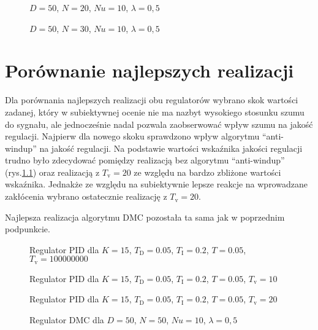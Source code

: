\begin{figure}[H]
\centering

\caption{$ D = 50 $, $  N = 20 $, $ Nu = 10 $, $ \lambda = 0,5 $}
\label{DMC7}
\end{figure}

\begin{figure}[H]
\centering

\caption{$ D = 50 $, $  N = 30 $, $ Nu = 10 $, $ \lambda = 0,5 $}
\label{DMC8}
\end{figure}

\chapter{Porównanie najlepszych realizacji}
Dla porównania najlepszych realizacji obu regulatorów wybrano skok wartości zadanej, który w subiektywnej ocenie nie ma nazbyt wysokiego stosunku szumu do sygnału, ale jednocześnie nadal pozwala zaobserwować wpływ szumu na jakość regulacji. Najpierw dla nowego skoku sprawdzono wpływ algorytmu ``anti-windup'' na jakość regulacji. Na podstawie wartości wskaźnika jakości regulacji trudno było zdecydować pomiędzy realizacją bez algorytmu ``anti-windup'' (rys.\ref{PID1}) oraz realizacją z $T_\mathrm{v}=20$ ze względu na bardzo zbliżone wartości wskaźnika. Jednakże ze względu na subiektywnie lepsze reakcje na wprowadzane zakłócenia wybrano ostatecznie realizację z $T_\mathrm{v}=20$.

Najlepsza realizacja algorytmu DMC pozostała ta sama jak w poprzednim podpunkcie.

\begin{figure}[H]
\centering

\caption{Regulator PID dla $K = 15$, $T_\mathrm{D} = 0.05$, $T_\mathrm{I} = 0.2$, $T = 0.05$, $T_\mathrm{v} = 100000000$}
\label{PID1}
\end{figure}

\begin{figure}[H]
\centering

\caption{Regulator PID dla $K = 15$, $T_\mathrm{D} = 0.05$, $T_\mathrm{I} = 0.2$, $T = 0.05$, $T_\mathrm{v} = 10$}
\label{PID2}
\end{figure}

\begin{figure}[H]
\centering

\caption{Regulator PID dla $K = 15$, $T_\mathrm{D} = 0.05$, $T_\mathrm{I} = 0.2$, $T = 0.05$, $T_\mathrm{v} = 20$}
\label{PID3}
\end{figure}

\begin{figure}[H]
\centering

\caption{Regulator DMC dla $ D = 50 $, $  N = 50 $, $ Nu = 10 $, $ \lambda = 0,5 $}
\label{DMC6_2}
\end{figure}

